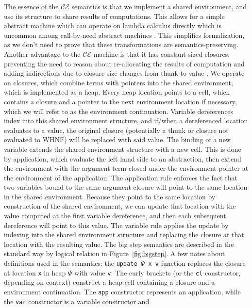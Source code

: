 The essence of the $\mathcal{CE}$ semantics is that we implement a shared
environment, and use its structure to share results of computations. This allows
for a simple abstract machine which can operate on lambda calculus directly
which is uncommon among call-by-need abstract machines
\cite{jonesstg,launchburynatural,TIM,johnsson1984efficient}. This simplifies
formalization, as we don't need to prove that these transformations are
semantics-preserving. Another advantage to the $\mathcal{CE}$ machine is that it
has constant sized closures, preventing the need to reason about re-allocating
the results of computation and adding indirections due to closure size changes
from thunk to value \cite{jonesstg}. We operate on closures, which combine terms with
pointers into the shared environment, which is implemented as a heap. Every heap
location points to a cell, which contains a closure and a pointer to the next
environment location if necessary, which we will refer to as the environment
continuation. Variable dereferences index into this shared environment
structure, and if/when a dereferenced location evaluates to a value, the
original closure (potentially a thunk or closure not evaluated to WHNF) will be
replaced with said value. The binding of a new variable extends the shared
environment structure with a new cell. This is done by application, which
evaluate the left hand side to an
abstraction, then extend the environment with the argument term closed under the
environment pointer at the environment of the application. The application rule
enforces the fact that two variables bound to the same argument closure will
point to the same location in the shared environment. Because they point to the
same location by construction of the shared environment, we can update that
location with the value computed at the first variable dereference, and then
each subsequent dereference will point to this value. The variable rule applies
the update by indexing into the shared environment structure and replacing the
closure at that location with the resulting value. The big step semantics are
described in the standard way by logical relation in Figure~\ref{fig:bigstep}. A
few notes about definitions used in the semantics: the \texttt{update $\Psi$ x
v} function replaces the closure at location \texttt{x} in heap $\Psi$ with
value \texttt{v}. The curly brackets (or the \texttt{cl} constructor,
depending on context) construct a heap cell containing a closure and a
environment continuation. The \texttt{app} constructor represents an
application, while the \texttt{var} constructor is a variable constructor and
